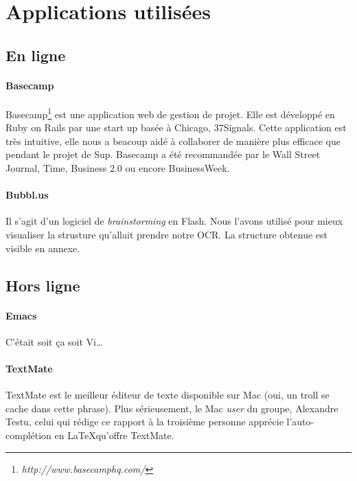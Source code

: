 \documentclass[]{report}
\begin{document}
	
	\section{Applications utilis\'ees} %
	\label{sec:applications_utilis'ees}
		\subsection{En ligne} %
		\label{sub:en_ligne}
			\paragraph{Basecamp\\} %
			\label{par:basecamp}
			Basecamp\footnote{\emph{http://www.basecamphq.com/}} est une application web de gestion de projet. Elle est développ\'e en Ruby on Rails par une start up bas\'ee \`a Chicago, 37Signals. Cette application est tr\`es intuitive, elle nous a beacoup aid\'e \`a collaborer de mani\`ere plus efficace que pendant le projet de Sup. Basecamp a \'et\'e recommand\'ee par le Wall Street Journal, Time, Business 2.0 ou encore BusinessWeek.
			\paragraph{Bubbl.us\\} %
			\label{par:bubbl_us}
			Il s'agit d'un logiciel de \emph{brainstorming} en Flash. Nous l'avons utilis\'e pour mieux visualiser la strusture qu'allait prendre notre OCR. La structure obtenue est visible en annexe. %
		\subsection{Hors ligne} %
		\label{sub:hors_ligne}
			\paragraph{Emacs\\} %
			\label{par:emacs}
				C'\'etait soit \c ca soit Vi\ldots
			\paragraph{TextMate\\} %
			\label{par:textmate}
				TextMate est le meilleur \'editeur de texte disponible sur Mac (oui, un troll se cache dans cette phrase). Plus s\'erieusement, le Mac \emph{user} du groupe, Alexandre Testu, celui qui r\'edige ce rapport \`a la troisi\`eme personne appr\'ecie l'auto-compl\'etion en \LaTeX qu'offre TextMate.
\end{document}
